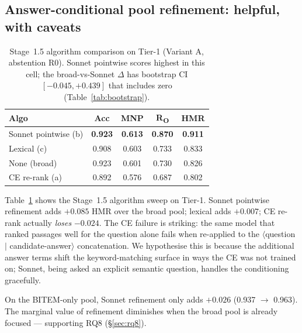 \documentclass[11pt,a4paper]{article}
\newcommand{\HMR}{\textsc{HMR}}
\begin{document}
\subsection{Answer-conditional pool refinement: helpful, with caveats}\label{sec:rq6}

\begin{table}[t]
\centering
\caption{Stage~1.5 algorithm comparison on Tier-1 (Variant A,
abstention R0). Sonnet pointwise scores highest in this cell;
the broad-vs-Sonnet $\Delta$ has bootstrap CI $[-0.045,+0.439]$
that includes zero (Table~\ref{tab:bootstrap}).}
\label{tab:rq6}
\begin{tabular}{lcccc}
\toprule
Algo & Acc & MNP & R\textsubscript{O} & \HMR \\
\midrule
Sonnet pointwise (b) & \textbf{0.923} & \textbf{0.613} & \textbf{0.870} & \textbf{0.911} \\
Lexical (c)         & 0.908 & 0.603 & 0.733 & 0.833 \\
None (broad)        & 0.923 & 0.601 & 0.730 & 0.826 \\
CE re-rank (a)      & 0.892 & 0.576 & 0.687 & 0.802 \\
\bottomrule
\end{tabular}
\end{table}

Table~\ref{tab:rq6} shows the Stage~1.5 algorithm sweep on Tier-1.
Sonnet pointwise refinement adds $+0.085$ \HMR{} over the broad
pool; lexical adds $+0.007$; CE re-rank actually \emph{loses}
$-0.024$. The CE failure is striking: the same model that ranked
passages well for the question alone fails when re-applied to the
$\langle$question $|$ candidate-answer$\rangle$ concatenation.
We hypothesise this is because the additional answer terms shift the
keyword-matching surface in ways the CE was not trained on; Sonnet,
being asked an explicit semantic question, handles the conditioning
gracefully.

On the BITEM-only pool, Sonnet refinement only adds $+0.026$ (0.937
$\rightarrow$ 0.963). The marginal value of refinement diminishes when
the broad pool is already focused — supporting RQ8 (\S\ref{sec:rq8}).
\end{document}
